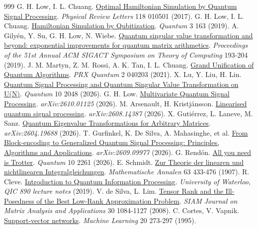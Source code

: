 \begin{thebibliography}{999}
 G. H. Low, I. L. Chuang. \href{https://doi.org/10.1103/PhysRevLett.118.010501}{Optimal Hamiltonian Simulation by Quantum Signal Processing}. \emph{Physical Review Letters} 118 010501 (2017).
 G. H. Low, I. L. Chuang. \href{https://doi.org/10.22331/q-2019-07-12-163}{Hamiltonian Simulation by Qubitization}. \emph{Quantum} 3 163 (2019).
 A. Gilyén, Y. Su, G. H. Low, N. Wiebe. \href{https://doi.org/10.1145/3313276.3316366}{Quantum singular value transformation and beyond: exponential improvements for quantum matrix arithmetics}. \emph{Proceedings of the 51st Annual ACM SIGACT Symposium on Theory of Computing} 193-204 (2019).
 J. M. Martyn, Z. M. Rossi, A. K. Tan, I. L. Chuang. \href{https://doi.org/10.1103/PRXQuantum.2.040203}{Grand Unification of Quantum Algorithms}. \emph{PRX Quantum} 2 040203 (2021).
 X. Lu, Y. Liu, H. Lin. \href{https://doi.org/10.22331/q-2026-03-27-2048}{Quantum Signal Processing and Quantum Singular Value Transformation on U(N)}. \emph{Quantum} 10 2048 (2026).
 G. H. Low. \href{https://arxiv.org/abs/2610.01125}{Multivariate Quantum Signal Processing}. \emph{arXiv:2610.01125}  (2026).
 M. Arsenault, H. Kristjánsson. \href{https://arxiv.org/abs/2608.14387}{Linearised quantum signal processing}. \emph{arXiv:2608.14387}  (2026).
 X. Gutiérrez, L. Laneve, M. Sanz. \href{https://arxiv.org/abs/2604.19688}{Quantum Eigenvalue Transformations for Arbitrary Matrices}. \emph{arXiv:2604.19688}  (2026).
 T. Gurfinkel, K. De Silva, A. Mahasinghe, et al. \href{https://arxiv.org/abs/2609.09977}{From Block-encoding to Generalized Quantum Signal Processing: Principles, Algorithms and Applications}. \emph{arXiv:2609.09977}  (2026).
 G. Rendón. \href{https://doi.org/10.22331/q-2026-11-06-2261}{All you need is Trotter}. \emph{Quantum} 10 2261 (2026).
 E. Schmidt. \href{https://doi.org/10.1007/BF01449770}{Zur Theorie der linearen und nichtlinearen Integralgleichungen}. \emph{Mathematische Annalen} 63 433-476 (1907).
 R. Cleve. \href{https://cleve.iqc.uwaterloo.ca/resources/Qic890LectureNotes2019Apr22\%28V22\%29.pdf}{Introduction to Quantum Information Processing}. \emph{University of Waterloo, QIC 890 lecture notes}  (2019).
 V. de Silva, L. Lim. \href{https://doi.org/10.1137/06066518X}{Tensor Rank and the Ill-Posedness of the Best Low-Rank Approximation Problem}. \emph{SIAM Journal on Matrix Analysis and Applications} 30 1084-1127 (2008).
 C. Cortes, V. Vapnik. \href{https://doi.org/10.1007/BF00994018}{Support-vector networks}. \emph{Machine Learning} 20 273-297 (1995).

\end{thebibliography}
